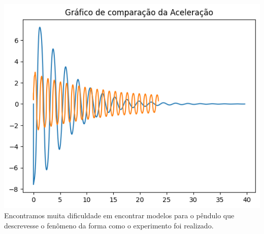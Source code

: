 \documentclass{article}
\begin{document}
\includegraphics{P-comparacao-aceleracao.png}\\

Encontramos muita dificuldade em encontrar modelos para o pêndulo que descrevesse o fenômeno da forma como o experimento foi realizado.
\end{document}
